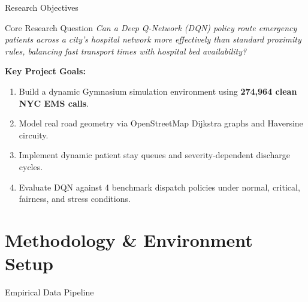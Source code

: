 \documentclass[aspectratio=169, 10pt]{beamer}
\begin{document}
\begin{frame}{Research Objectives}
    \begin{block}{Core Research Question}
        \textit{Can a Deep Q-Network (DQN) policy route emergency patients across a city's hospital network more effectively than standard proximity rules, balancing fast transport times with hospital bed availability?}
    \end{block}

    \vspace{0.3cm}
    \textbf{Key Project Goals:}
    \begin{enumerate}
        \item Build a dynamic Gymnasium simulation environment using \textbf{274,964 clean NYC EMS calls}.
        \item Model real road geometry via OpenStreetMap Dijkstra graphs and Haversine circuity.
        \item Implement dynamic patient stay queues and severity-dependent discharge cycles.
        \item Evaluate DQN against 4 benchmark dispatch policies under normal, critical, fairness, and stress conditions.
    \end{enumerate}
\end{frame}

\section{Methodology \& Environment Setup}

\begin{frame}{Empirical Data Pipeline}
    \begin{table}
        \centering
        \caption{Summary of Data Infrastructure}
    \end{table}
\end{frame}
\end{document}
